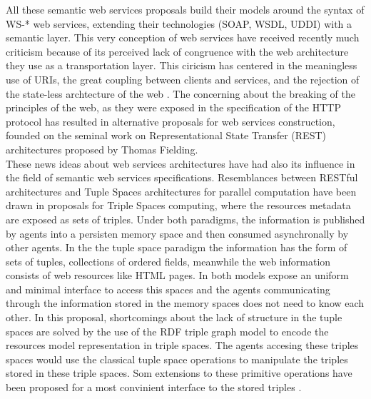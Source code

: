All these semantic web services proposals build their models around the syntax of WS-* web services, extending their
technologies (SOAP, WSDL, UDDI) with a semantic layer. This very conception of web services have received recently much
criticism because of its perceived lack of congruence with the web architecture they use as a transportation layer. This
ciricism has centered in the meaningless use of URIs, the great coupling between clients and services, and the rejection
of the state-less archtecture of the web \cite{FieldingTaylor02toit}. The concerning about the breaking of the principles of the web, as
they were exposed in the specification of the HTTP protocol has resulted in alternative proposals for web services
construction,  founded on the seminal work on Representational State Transfer (REST) \cite{Fiel00} architectures
proposed by Thomas Fielding. \\

These news ideas about web services architectures have had also its influence in the field of semantic web services
specifications. Resemblances between RESTful architectures and Tuple Spaces architectures for parallel computation have
been drawn \cite{Fensel04triple-spacecomputing:} in proposals for Triple Spaces computing, where the resources metadata are
exposed as sets of triples. Under both paradigms, the information is published by agents into a persisten memory space  and then consumed asynchronally
by other agents. In the the tuple space paradigm the information has the form of sets of tuples, collections of ordered
fields, meanwhile the web information consists of web resources like HTML pages. In both models expose an uniform and minimal interface to access this spaces and the agents communicating
through the information stored in the memory spaces does not need to know each other. In this proposal, shortcomings about the lack of structure in the tuple spaces \cite{journals/jss/JohansonF04} are solved by
the use of the RDF triple graph model \cite{Hayes:04:RS} to encode the resources model representation in triple spaces. The agents
accesing these triples spaces would use the classical tuple space operations to manipulate the triples stored in these
triple spaces. Som extensions to these primitive operations have been proposed for a most convinient interface to the
stored triples \cite{Simperl07acoordination}.

